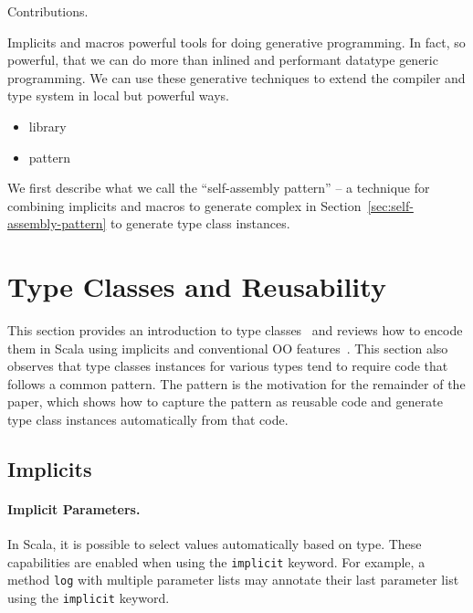 \documentclass[preprint]{sigplanconf}
\newcommand{\term}[1]{\mbox{\texttt{#1}}}
\begin{document}
Contributions.

Implicits and macros powerful tools for doing generative programming. In fact, so powerful, that we can do more than inlined and performant datatype generic programming. We can use these generative techniques to extend the compiler and type system in local but powerful ways.

\begin{itemize}
\item library
\item pattern
\end{itemize}

We first describe what we call the ``self-assembly pattern'' -- a technique for combining implicits and macros to generate complex in Section~\ref{sec:self-assembly-pattern} to generate type class instances.

\section{Type Classes and Reusability}
\label{sec:background}

This section provides an introduction to type classes~\cite{} and reviews how to
encode them in Scala using implicits and conventional OO features~\cite{Oliveira2010}.
This section also observes that type classes instances for various
types tend to require code that follows a common pattern. The pattern
is the motivation for the remainder of the paper, which shows how
to capture the pattern as reusable code and generate type class
instances automatically from that code.


% 
% 

\subsection{Implicits}
\label{sec:implicits}

\paragraph{Implicit Parameters.} In Scala, it is possible to select values
automatically based on type. These capabilities are enabled when using the
\term{implicit} keyword. For example, a method \term{log} with multiple
parameter lists may annotate their last parameter list using the
\term{implicit} keyword.%
\end{document}

